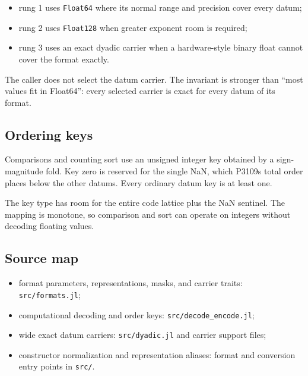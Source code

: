 \begin{itemize}
\item rung 1 uses \texttt{Float64} where its normal range and precision cover every datum;


\item rung 2 uses \texttt{Float128} when greater exponent room is required;


\item rung 3 uses an exact dyadic carrier when a hardware-style binary float cannot cover the format exactly.

\end{itemize}


The caller does not select the datum carrier. The invariant is stronger than “most values fit in Float64”: every selected carrier is exact for every datum of its format.



\subsection{Ordering keys}



\label{2454074481418767952}{}


Comparisons and counting sort use an unsigned integer key obtained by a sign-magnitude fold. Key zero is reserved for the single NaN, which P3109{\textquotesingle}s total order places below the other datums. Every ordinary datum key is at least one.



The key type has room for the entire code lattice plus the NaN sentinel. The mapping is monotone, so comparison and sort can operate on integers without decoding floating values.



\subsection{Source map}



\label{18273178321310211874}{}


\begin{itemize}
\item format parameters, representations, masks, and carrier traits: \texttt{src/formats.jl};


\item computational decoding and order keys: \texttt{src/decode\_\allowbreak{}encode.jl};


\item wide exact datum carriers: \texttt{src/dyadic.jl} and carrier support files;


\item constructor normalization and representation aliases: format and conversion entry points in \texttt{src/}.

\end{itemize}


